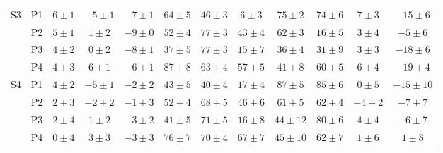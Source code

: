 \begin{table}[!ht]
{\begin{tabular}{|c|c||c|c|c|c|c|c|c|c|c|c|}
    \hline
    \hline
    \multirow{4}{*}{S3} & P1 & $6\pm 1$ & $-5\pm 1$ & $-7\pm 1$ & $64\pm 5$ & $46\pm 3$ & $6\pm 3$ & $75\pm 2$ & $74\pm 6$ & $7\pm 3$ & $-15\pm 6$ \\
     & P2 & $5\pm 1$ & $1\pm 2$ & $-9\pm 0$ & $52\pm 4$ & $77\pm 3$ & $43\pm 4$ & $62\pm 3$ & $16\pm 5$ & $3\pm 4$ & $-5\pm 6$ \\
     & P3 & $4\pm 2$ & $0\pm 2$ & $-8\pm 1$ & $37\pm 5$ & $77\pm 3$ & $15\pm 7$ & $36\pm 4$ & $31\pm 9$ & $3\pm 3$ & $-18\pm 6$ \\
     & P4 & $4\pm 3$ & $6\pm 1$ & $-6\pm 1$ & $87\pm 8$ & $63\pm 4$ & $57\pm 5$ & $41\pm 8$ & $60\pm 5$ & $6\pm 4$ & $-19\pm 4$ \\
    
    \hline
    \hline
    \multirow{4}{*}{S4} & P1 & $4\pm 2$ & $-5\pm 1$ & $-2\pm 2$ & $43\pm 5$ & $40\pm 4$ & $17\pm 4$ & $87\pm 5$ & $85\pm 6$ & $0\pm 5$ & $-15\pm 10$ \\
     & P2 & $2\pm 3$ & $-2\pm 2$ & $-1\pm 3$ & $52\pm 4$ & $68\pm 5$ & $46\pm 6$ & $61\pm 5$ & $62\pm 4$ & $-4\pm 2$ & $-7\pm 7$ \\
     & P3 & $2\pm 4$ & $1\pm 2$ & $-3\pm 2$ & $41\pm 5$ & $71\pm 5$ & $16\pm 8$ & $44\pm 12$ & $80\pm 6$ & $4\pm 4$ & $-6\pm 7$ \\
     & P4 & $0\pm 4$ & $3\pm 3$ & $-3\pm 3$ & $76\pm 7$ & $70\pm 4$ & $67\pm 7$ & $45\pm 10$ & $62\pm 7$ & $1\pm 6$ & $1\pm 8$ \\
    

\end{tabular}}
\end{table}
